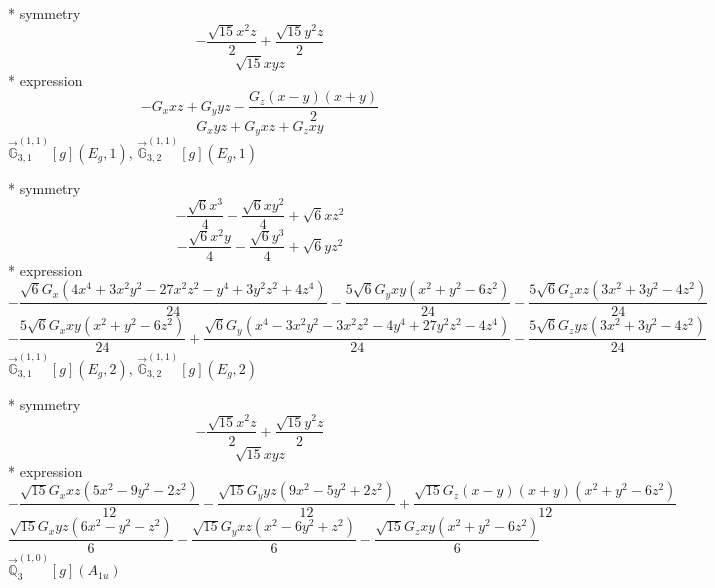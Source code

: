 \documentclass[fleqn,8pt]{jsarticle}
\begin{document}
\noindent\quad ** symmetry
\begin{dmath*}
- \frac{\sqrt{15} x^{2} z}{2} + \frac{\sqrt{15} y^{2} z}{2}
\end{dmath*}
\begin{dmath*}
\sqrt{15} x y z
\end{dmath*}
\noindent\quad ** expression
\begin{dmath*}
- G_{x} x z + G_{y} y z - \frac{G_{z} \left(x - y\right) \left(x + y\right)}{2}
\end{dmath*}
\begin{dmath*}
G_{x} y z + G_{y} x z + G_{z} x y
\end{dmath*}
\noindent\quad $\vec{\mathbb{G}}_{3,1}^{(1,1)}[g](E_{g},1)$, $\vec{\mathbb{G}}_{3,2}^{(1,1)}[g](E_{g},1)$

\noindent\quad ** symmetry
\begin{dmath*}
- \frac{\sqrt{6} x^{3}}{4} - \frac{\sqrt{6} x y^{2}}{4} + \sqrt{6} x z^{2}
\end{dmath*}
\begin{dmath*}
- \frac{\sqrt{6} x^{2} y}{4} - \frac{\sqrt{6} y^{3}}{4} + \sqrt{6} y z^{2}
\end{dmath*}
\noindent\quad ** expression
\begin{dmath*}
- \frac{\sqrt{6} G_{x} \left(4 x^{4} + 3 x^{2} y^{2} - 27 x^{2} z^{2} - y^{4} + 3 y^{2} z^{2} + 4 z^{4}\right)}{24} - \frac{5 \sqrt{6} G_{y} x y \left(x^{2} + y^{2} - 6 z^{2}\right)}{24} - \frac{5 \sqrt{6} G_{z} x z \left(3 x^{2} + 3 y^{2} - 4 z^{2}\right)}{24}
\end{dmath*}
\begin{dmath*}
- \frac{5 \sqrt{6} G_{x} x y \left(x^{2} + y^{2} - 6 z^{2}\right)}{24} + \frac{\sqrt{6} G_{y} \left(x^{4} - 3 x^{2} y^{2} - 3 x^{2} z^{2} - 4 y^{4} + 27 y^{2} z^{2} - 4 z^{4}\right)}{24} - \frac{5 \sqrt{6} G_{z} y z \left(3 x^{2} + 3 y^{2} - 4 z^{2}\right)}{24}
\end{dmath*}
\noindent\quad $\vec{\mathbb{G}}_{3,1}^{(1,1)}[g](E_{g},2)$, $\vec{\mathbb{G}}_{3,2}^{(1,1)}[g](E_{g},2)$

\noindent\quad ** symmetry
\begin{dmath*}
- \frac{\sqrt{15} x^{2} z}{2} + \frac{\sqrt{15} y^{2} z}{2}
\end{dmath*}
\begin{dmath*}
\sqrt{15} x y z
\end{dmath*}
\noindent\quad ** expression
\begin{dmath*}
- \frac{\sqrt{15} G_{x} x z \left(5 x^{2} - 9 y^{2} - 2 z^{2}\right)}{12} - \frac{\sqrt{15} G_{y} y z \left(9 x^{2} - 5 y^{2} + 2 z^{2}\right)}{12} + \frac{\sqrt{15} G_{z} \left(x - y\right) \left(x + y\right) \left(x^{2} + y^{2} - 6 z^{2}\right)}{12}
\end{dmath*}
\begin{dmath*}
\frac{\sqrt{15} G_{x} y z \left(6 x^{2} - y^{2} - z^{2}\right)}{6} - \frac{\sqrt{15} G_{y} x z \left(x^{2} - 6 y^{2} + z^{2}\right)}{6} - \frac{\sqrt{15} G_{z} x y \left(x^{2} + y^{2} - 6 z^{2}\right)}{6}
\end{dmath*}
\noindent\quad $\vec{\mathbb{Q}}_{3}^{(1,0)}[g](A_{1u})$
\end{document}
